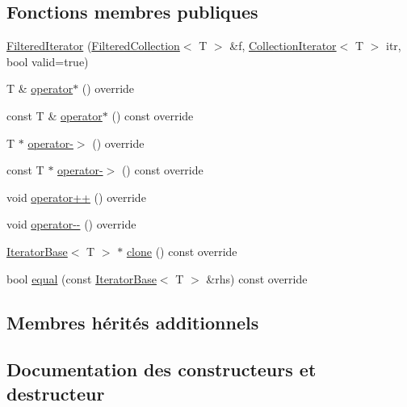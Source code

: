 \subsection*{Fonctions membres publiques}
\begin{DoxyCompactItemize}
\item 
\hyperlink{class_filtered_iterator_a7d4de1fd089da50804d41dcf387b5e4e}{Filtered\+Iterator} (\hyperlink{class_filtered_collection}{Filtered\+Collection}$<$ T $>$ \&f, \hyperlink{class_collection_iterator}{Collection\+Iterator}$<$ T $>$ itr, bool valid=true)
\item 
T \& \hyperlink{class_filtered_iterator_ac891b168cd653612ddc7ed7cb4380196}{operator$\ast$} () override
\item 
const T \& \hyperlink{class_filtered_iterator_aab76ce411b72c85c3e6a9007a6c9fd98}{operator$\ast$} () const override
\item 
T $\ast$ \hyperlink{class_filtered_iterator_a413726d7cc9a951d0a30eaee6cf36de1}{operator-\/$>$} () override
\item 
const T $\ast$ \hyperlink{class_filtered_iterator_a75ea4ec86c45f496c1515e8e9832cd0f}{operator-\/$>$} () const override
\item 
void \hyperlink{class_filtered_iterator_ae31347c47637172be3d19dc3be30f5cc}{operator++} () override
\item 
void \hyperlink{class_filtered_iterator_a860a37fdf31e87a96b80cb295e6d34c2}{operator-\/-\/} () override
\item 
\hyperlink{class_iterator_base}{Iterator\+Base}$<$ T $>$ $\ast$ \hyperlink{class_filtered_iterator_a79d512a43aa4d31caf26908e93130b9d}{clone} () const override
\item 
bool \hyperlink{class_filtered_iterator_a7118ec2bba2bf138ca771a394a8d72c8}{equal} (const \hyperlink{class_iterator_base}{Iterator\+Base}$<$ T $>$ \&rhs) const override
\end{DoxyCompactItemize}
\subsection*{Membres hérités additionnels}


\subsection{Documentation des constructeurs et destructeur}
\mbox{\label{class_filtered_iterator_a7d4de1fd089da50804d41dcf387b5e4e}} 
